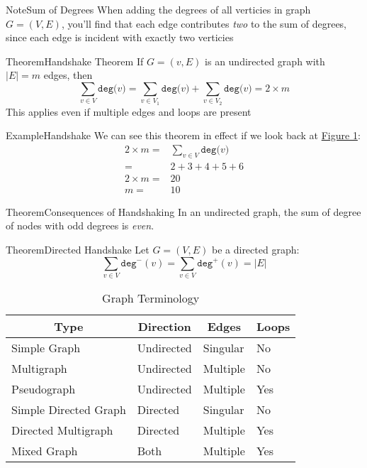 \documentclass{MathNotes}
\newenvironment{example}[1]{\begin{BlueBox}{Example}{#1}}{\end{BlueBox}}
\newenvironment{note}[1]{\begin{YellowBox}{Note}{#1}}{\end{YellowBox}}
\newenvironment{theorem}[1]{\begin{GrayBox}{Theorem}{#1}}{\end{GrayBox}}
\begin{document}
\begin{note}{Sum of Degrees}
    When adding the degrees of all verticies in graph $G=(V,E)$, you'll find
    that each edge contributes \textit{two} to the sum of degrees, since
    each edge is incident with exactly two verticies
\end{note}

\begin{theorem}{Handshake Theorem}
	If $G=(v,E)$ is an undirected graph with $|E|=m$ edges, then
    \[\sum_{v\in V}\texttt{deg($v$)}=\sum_{v\in V_1}\texttt{deg($v$)}+\sum_{v\in V_2}\texttt{deg($v$)}=2\times m\]
    This applies even if multiple edges and loops are present
\end{theorem}

\begin{example}{Handshake}
We can see this theorem in effect if we look back at
\hyperref[fig:neighborhoods]{Figure 1}:
    \begin{align*}
        2\times m =& \sum_{v\in V}\texttt{deg($v$)}\\
        =& 2 + 3 + 4 + 5 + 6\\
        2\times m =& 20 \\
        m =& 10
    \end{align*}
\end{example}

\newpage
\begin{multicols}{2}
\begin{theorem}{Consequences of Handshaking}
	In an undirected graph, the  sum of degree of nodes with odd degrees is
    \textit{even}. 
\end{theorem}
\begin{theorem}{Directed Handshake}
    Let $G=(V,E)$ be a directed graph: 
    \[\sum_{v\in V}\texttt{deg}^-(v)=\sum_{v\in V}\texttt{deg}^+(v)=|E|\]
\end{theorem}
\end{multicols}

\begin{table}[h!]
	\centering
	\caption{Graph Terminology}
	\begin{tabular}{llll}
		\multicolumn{1}{c}{\textbf{Type}}      &
		\multicolumn{1}{c}{\textbf{Direction}} &
		\multicolumn{1}{c}{\textbf{Edges}}     &
		\multicolumn{1}{c}{\textbf{Loops}}                                   \\
		\midrule
		Simple Graph                           & Undirected & Singular & No  \\
		Multigraph                             & Undirected & Multiple & No  \\
		Pseudograph                            & Undirected & Multiple & Yes \\
		Simple Directed Graph                  & Directed   & Singular & No  \\
		Directed Multigraph                    & Directed   & Multiple & Yes \\
		Mixed Graph                            & Both       & Multiple & Yes \\
	\end{tabular}
\end{table}
\end{document}
